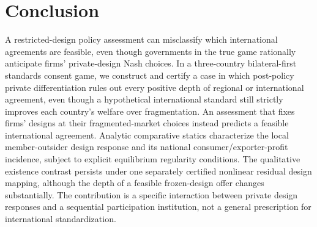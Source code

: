 \section{Conclusion}\label{sec:conclusion}

A restricted-design policy assessment can misclassify
which international agreements are feasible, even though
governments in the true game rationally anticipate firms'
private-design Nash choices. In a
three-country bilateral-first standards
consent game, we construct and certify a
case in which post-policy private
differentiation rules out every positive
depth of regional or international
agreement, even though a hypothetical
international standard still strictly
improves each country's welfare over
fragmentation. An assessment that fixes firms' designs at their
fragmented-market choices instead predicts a feasible
international agreement. Analytic comparative statics
characterize the local member-outsider design response
and its national consumer/exporter-profit incidence,
subject to explicit equilibrium regularity conditions. The qualitative
existence contrast persists under one
separately certified nonlinear residual
design mapping, although the depth of a
feasible frozen-design offer changes
substantially. The contribution is a
specific interaction between private
design responses and a sequential
participation institution, not a
general prescription for international
standardization.
